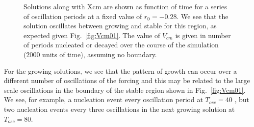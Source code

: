 \documentclass[pre,preprint,superscriptaddress]{revtex4-1}
\begin{document}
\begin{figure}[h!]
\begin{center}
{      }
    \caption{Solutions along with Xcm are shown as  function of time for a series of oscillation periods at a fixed value of $r_0=-0.28$.  We see that the solution oscillates between growing and stable for this region, as expected given Fig.~\ref{fig:Vcm01}.  The value of $V_{cm}$ is given in number of periods nucleated or decayed over the course of the simulation (2000 units of time), assuming no boundary.}
    \label{fig:r28slice2}
  \end{center}
\end{figure} 
For the growing solutions, we see that the pattern of growth can occur over a different number of oscillations of the forcing and this may be related to the large scale oscillations in the boundary of the stable region shown in Fig.~\ref{fig:Vcm01}.  We see, for example, a nucleation event every oscillation period at $T_{osc}=40$ , but two nucleation events every three oscillations in the next growing solution at $T_{osc}=80$.
\end{document}
